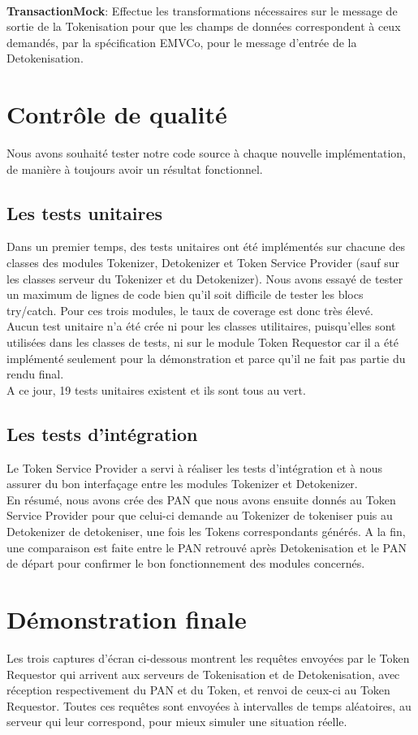 \documentclass{report}
\begin{document}
~\\
\noindent
\textbf{TransactionMock}: Effectue les transformations nécessaires sur le message de sortie de la Tokenisation pour que les champs de données correspondent à ceux demandés, par la spécification EMVCo, pour le message d'entrée de la Detokenisation.


\section{Contrôle de qualité}
Nous avons souhaité tester notre code source à chaque nouvelle implémentation, de manière à toujours avoir un résultat fonctionnel.  

\subsection{Les tests unitaires}
Dans un premier temps, des tests unitaires ont été implémentés sur chacune des classes des modules Tokenizer, Detokenizer et Token Service Provider (sauf sur les classes serveur du Tokenizer et du Detokenizer). Nous avons essayé de tester un maximum de lignes de code bien qu'il soit difficile de tester les blocs try/catch. Pour ces trois modules, le taux de coverage est donc très élevé.\\
Aucun test unitaire n'a été crée ni pour les classes utilitaires, puisqu'elles sont utilisées dans les classes de tests, ni sur le module Token Requestor car il a été implémenté seulement pour la démonstration et parce qu'il ne fait pas partie du rendu final.\\
A ce jour, 19 tests unitaires existent et ils sont tous au vert.

\subsection{Les tests d'intégration}
Le Token Service Provider a servi à réaliser les tests d'intégration et à nous assurer du bon interfaçage entre les modules Tokenizer et Detokenizer.\\
En résumé, nous avons crée des PAN que nous avons ensuite donnés au Token Service Provider pour que celui-ci demande au Tokenizer de tokeniser puis au Detokenizer de detokeniser, une fois les Tokens correspondants générés. A la fin, une comparaison est faite entre le PAN retrouvé après Detokenisation et le PAN de départ pour confirmer le bon fonctionnement des modules concernés. 

\section{Démonstration finale}
Les trois captures d'écran ci-dessous montrent les requêtes envoyées par le Token Requestor qui arrivent aux serveurs de Tokenisation et de Detokenisation, avec réception respectivement du PAN et du Token, et renvoi de ceux-ci au Token Requestor. Toutes ces requêtes sont envoyées à intervalles de temps aléatoires, au serveur qui leur correspond, pour mieux simuler une situation réelle. 
\end{document}
